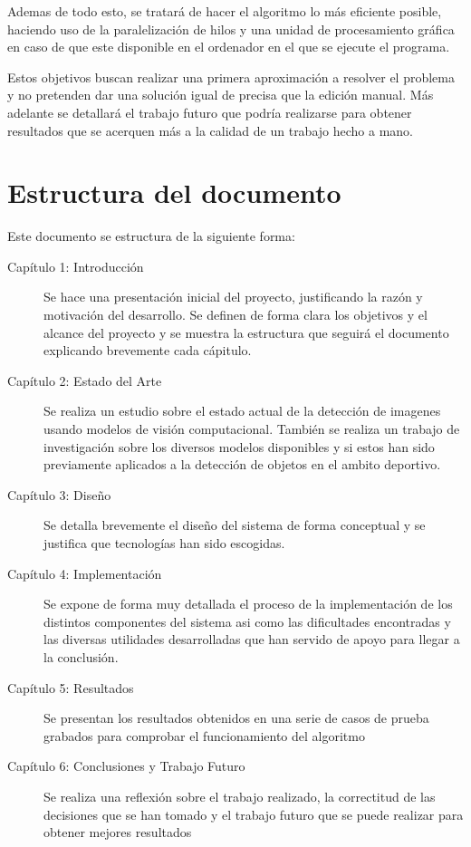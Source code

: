 Ademas de todo esto, se tratará de hacer el algoritmo lo más eficiente posible, haciendo uso de la paralelización de hilos y una unidad de procesamiento gráfica en caso de que este disponible en el ordenador en el que se ejecute el programa.

Estos objetivos buscan realizar una primera aproximación a resolver el problema y no pretenden dar una solución igual de precisa que la edición manual. Más adelante se detallará el trabajo futuro que podría realizarse para obtener resultados que se acerquen más a la calidad de un trabajo hecho a mano.


\section[Estructura del documento]{Estructura del documento}

Este documento se estructura de la siguiente forma:

\begin{description}
	\item [Capítulo 1: Introducción] Se hace una presentación inicial del proyecto, justificando la razón y motivación del desarrollo. Se definen de forma clara los objetivos y el alcance del proyecto y se muestra la estructura que seguirá el documento explicando brevemente cada cápitulo.
	\item [Capítulo 2: Estado del Arte] Se realiza un estudio sobre el estado actual de la detección de imagenes usando modelos de visión computacional. También se realiza un trabajo de investigación sobre los diversos modelos disponibles y si estos han sido previamente aplicados a la detección de objetos en el ambito deportivo.
	\item [Capítulo 3: Diseño] Se detalla brevemente el diseño del sistema de forma conceptual y se justifica que tecnologías han sido escogidas.
	\item [Capítulo 4: Implementación] Se expone de forma muy detallada el proceso de la implementación de los distintos componentes del sistema asi como las dificultades encontradas y las diversas utilidades desarrolladas que han servido de apoyo para llegar a la conclusión.
	\item [Capítulo 5: Resultados] Se presentan los resultados obtenidos en una serie de casos de prueba grabados para comprobar el funcionamiento del algoritmo
	\item [Capítulo 6: Conclusiones y Trabajo Futuro] Se realiza una reflexión sobre el trabajo realizado, la correctitud de las decisiones que se han tomado y el trabajo futuro que se puede realizar para obtener mejores resultados
\end{description}
